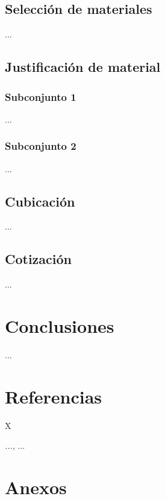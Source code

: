 \documentclass[12pt]{article}
\begin{document}
\subsection{Selección de materiales}

\qquad ... 

\newpage
\subsection{Justificación de material}

\subsubsection{Subconjunto 1}

\qquad ...

\subsubsection{Subconjunto 2}

\qquad ...

\newpage
\subsection{Cubicación}

\qquad ...


\newpage
\subsection{Cotización}

\qquad ...


\newpage
\section{Conclusiones}

\qquad ...


\newpage
\section{Referencias}
\renewcommand{\refname}{}
\begin{thebibliography}{X}

 \textit{...}, ...


\end{thebibliography}

\newpage
\section{Anexos}
\end{document}
